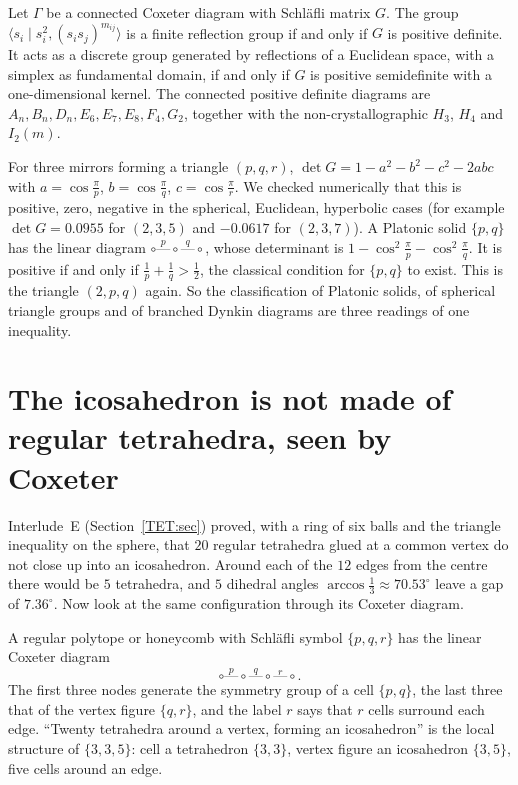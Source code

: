 \begin{theorem}[Coxeter 1934]\label{DYN:thm:coxeter}
Let $\Gamma$ be a connected Coxeter diagram with Schl\"afli matrix $G$. The group
$\langle s_i\mid s_i^2,(s_is_j)^{m_{ij}}\rangle$ is a finite reflection group if and only if $G$ is
positive definite. It acts as a discrete group generated by reflections of a Euclidean space, with a
simplex as fundamental domain, if and only if $G$ is positive semidefinite with a one-dimensional kernel.
The connected positive definite diagrams are $A_n,B_n,D_n,E_6,E_7,E_8,F_4,G_2$, together with the
non-crystallographic $H_3$, $H_4$ and $I_2(m)$.
\end{theorem}

For three mirrors forming a triangle $(p,q,r)$,
$\det G=1-a^2-b^2-c^2-2abc$ with $a=\cos\frac\pi p$, $b=\cos\frac\pi q$, $c=\cos\frac\pi r$. We checked
numerically that this is positive, zero, negative in the spherical, Euclidean, hyperbolic cases
(for example $\det G=0.0955$ for $(2,3,5)$ and $-0.0617$ for $(2,3,7)$). A Platonic solid $\{p,q\}$ has
the linear diagram $\circ\overset{p}{\text{---}}\circ\overset{q}{\text{---}}\circ$, whose determinant is
$1-\cos^2\frac\pi p-\cos^2\frac\pi q$. It is positive if and only if
$\frac1p+\frac1q>\frac12$, the classical condition for $\{p,q\}$ to exist. This is the triangle
$(2,p,q)$ again. So the classification of Platonic solids, of spherical triangle groups and of
branched Dynkin diagrams are three readings of one inequality.

\section[The icosahedron, seen by Coxeter]{The icosahedron is not made of regular tetrahedra, seen by Coxeter}
\label{DYN:sec:icosa}

Interlude~E (Section~\ref{TET:sec}) proved, with a ring of six balls and the triangle inequality on
the sphere, that $20$ regular tetrahedra glued at a common vertex do not close up into an icosahedron.
Around each of the $12$ edges from the centre there would be $5$ tetrahedra, and $5$ dihedral angles
$\arccos\frac13\approx70.53^\circ$ leave a gap of $7.36^\circ$. Now look at the same configuration
through its Coxeter diagram.

A regular polytope or honeycomb with Schl\"afli symbol $\{p,q,r\}$ has the linear Coxeter diagram
\[
  \circ\overset{p}{\text{---}}\circ\overset{q}{\text{---}}\circ\overset{r}{\text{---}}\circ .
\]
The first three nodes generate the symmetry group of a cell $\{p,q\}$, the last three that of the vertex
figure $\{q,r\}$, and the label $r$ says that $r$ cells surround each edge. ``Twenty tetrahedra around a
vertex, forming an icosahedron'' is the local structure of $\{3,3,5\}$: cell a tetrahedron $\{3,3\}$,
vertex figure an icosahedron $\{3,5\}$, five cells around an edge.

